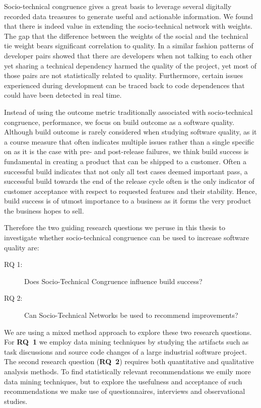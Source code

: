 Socio-technical congruence gives a great basis to leverage several digitally recorded data treasures to generate useful and actionable information.
We found that there is indeed value in extending the socio-technical network with weights.
The gap that the difference between the weights of the social and the technical tie weight bears significant correlation to quality.
In a similar fashion patterns of developer pairs showed that there are developers when not talking to each other yet sharing a technical dependency harmed the quality of the project, yet most of those pairs are not statistically related to quality.
Furthermore, certain issues experienced during development can be traced back to code dependences that could have been detected in real time.


Instead of using the outcome metric traditionally associated with socio-technical congruence, performance, we focus on build outcome as a software quality.
Although build outcome is rarely considered when studying software quality, as it a course measure that often indicates multiple issues rather than a single specific on as it is the case with pre- and post-release failures, we think build success is fundamental in creating a product that can be shipped to a customer.
Often a successful build indicates that not only all test cases deemed important pass, a successful build towards the end of the release cycle often is the only indicator of customer acceptance with respect to requested features and their stability.
Hence, build success is of utmost importance to a business as it forms the very product the business hopes to sell.

Therefore the two guiding research questions we peruse in this thesis to investigate whether socio-technical congruence can be used to increase software quality are:
\begin{description}
\item[RQ 1:] Does Socio-Technical Congruence influence build success?
\item[RQ 2:] Can Socio-Technical Networks be used to recommend improvements?
\end{description}

We are using a mixed method approach to explore these two research questions.
For \textbf{RQ~1} we employ data mining techniques by studying the artifacts such as task discussions and source code changes of a large industrial software project.
The second research question (\textbf{RQ~2}) requires both quantitative and qualitative analysis methods.
To find statistically relevant recommendations we emily more data mining techniques, but to explore the usefulness and acceptance of such recommendations we make use of questionnaires, interviews and observational studies.


